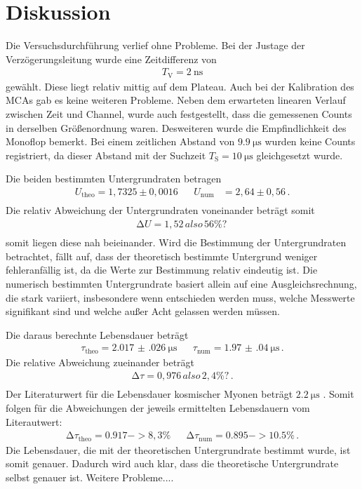 \section{Diskussion}
\label{sec:Diskussion}
Die Versuchsdurchführung verlief ohne Probleme.
Bei der Justage der Verzögerungsleitung wurde eine Zeitdifferenz von
\begin{align*}
    T_\text{V} = \SI{2}{\nano\second}
\end{align*}
gewählt.
Diese liegt relativ mittig auf dem Plateau.
Auch bei der Kalibration des MCAs gab es keine weiteren Probleme.
Neben dem erwarteten linearen Verlauf zwischen Zeit und Channel, wurde auch festgestellt, dass die gemessenen Counts in derselben Größenordnung waren.
Desweiteren wurde die Empfindlichkeit des Monoflop bemerkt.
Bei einem zeitlichen Abstand von $\SI{9.9}{\micro\second}$ wurden keine Counts registriert, da dieser Abstand mit der Suchzeit $T_\text{S} = \SI{10}{\micro\second}$ gleichgesetzt wurde.

\noindent
Die beiden bestimmten Untergrundraten betragen
\begin{align*}
    U_\text{theo} = 1,7325 \pm 0,0016 &&       U_\text{num} &= 2,64 \pm 0,56 \, . \\
\end{align*}
Die relativ Abweichung der Untergrundraten voneinander beträgt somit
\begin{align*}
    \increment U = 1,52 \, also \, 56\% ? \, \\
\end{align*} %
somit liegen diese nah beieinander.
Wird die Bestimmung der Untergrundraten betrachtet, fällt auf, dass der theoretisch bestimmte Untergrund weniger fehleranfällig ist, da die Werte zur Bestimmung relativ eindeutig ist.
Die numerisch bestimmten Untergrundrate basiert allein auf eine Ausgleichsrechnung, die stark variiert, insbesondere wenn entschieden werden muss, welche Messwerte signifikant sind und welche außer Acht gelassen werden müssen.

\noindent
Die daraus berechnte Lebensdauer beträgt
\begin{align*}
    \tau_\text{theo} = \SI{2.017(026)}{\micro\second} && \tau_\text{num} = \SI{1.97(04)}{\micro\second} \, .
\end{align*}
Die relative Abweichung zueinander beträgt
\begin{align*}
    \increment \tau = 0,976 \, also \, 2,4\% ? \, . \\
\end{align*}%
Der Literaturwert für die Lebensdauer kosmischer Myonen beträgt $\SI{2.2}{\micro\second}$ \cite{pdg}.
Somit folgen für die Abweichungen der jeweils ermittelten Lebensdauern vom Literautwert:
\begin{align*}
    \increment \tau_\text{theo} = 0.917 -> 8,3\% && \increment \tau_\text{num} = 0.895 -> 10.5\% \, .
\end{align*}
Die Lebensdauer, die mit der theoretischen Untergrundrate bestimmt wurde, ist somit genauer.
Dadurch wird auch klar, dass die theoretische Untergrundrate selbst genauer ist.
Weitere Probleme....